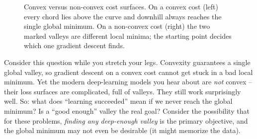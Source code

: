 \begin{figure}[H]
\centering
{}
\caption{Convex versus non-convex cost surfaces. On a convex cost (left) every
chord lies above the curve and downhill always reaches the single global minimum.
On a non-convex cost (right) the two marked valleys are different local minima;
the starting point decides which one gradient descent finds.}
\label{ch36:fig-convex}
\end{figure}

\begin{walkbox}
Consider this question while you stretch your legs. Convexity guarantees a
single global valley, so gradient descent on a convex cost cannot get stuck in a
bad local minimum. Yet the modern deep-learning models you hear about are
\emph{not} convex -- their loss surfaces are complicated, full of valleys. They still
work surprisingly well. So: what does ``learning succeeded'' mean if we
never reach the global minimum? Is a ``good enough'' valley the real goal? Consider
the possibility that for these problems, \emph{finding any deep-enough
valley} is the primary objective, and the global minimum may not even be desirable
(it might memorize the data).
\end{walkbox}

